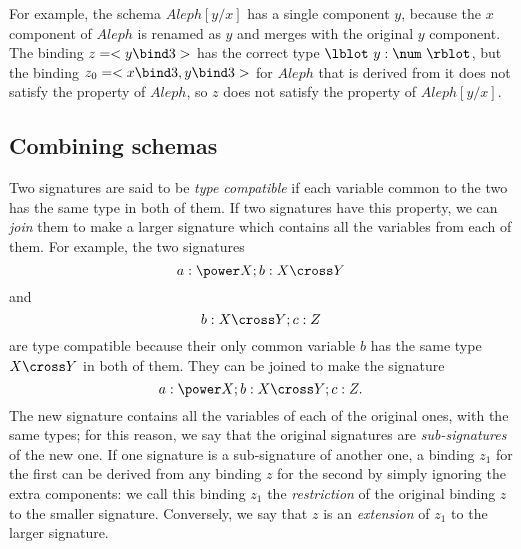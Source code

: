 \new For example, the schema $Aleph[y/x]$ has a single component
$y$, because the $x$ component of $Aleph$ is renamed as $y$ and
merges with the original $y$ component.  The binding $z = <y \bind 3>$
has the correct type $\lblot~y: \num~\rblot$, but the binding $z_0 =
<x \bind 3, y \bind 3>$ for $Aleph$ that is derived from it does not
satisfy the property of $Aleph$, so $z$ does not satisfy the
property of $Aleph[y/x]$.

\subsection{Combining schemas}\label{ss:combschema}

Two signatures are said to be 
{\em type compatible\/}%
if each variable common to the two has the same type in
both of them. If two signatures have this property, we can
{\em join\/}%
them to make a larger signature which contains all the variables
from each of them. For example, the two signatures
\[ a: \power X; b: X \cross Y \]
and
\[ b: X \cross Y; c: Z \] 
are type compatible because their only common variable $b$ has
the same type $X \cross Y$ in both of them. They can be joined to
make the signature
\[ a: \power X; b: X \cross Y; c: Z. \]
The new signature contains all the variables of each of the original
ones, with the same types; for this reason, we say that the original
signatures are {\em sub-signatures\/}%
of the new one. If one signature is a sub-signature of another one,
a binding $z_1$ for the first can be derived from any %
binding $z$ for
the second by simply ignoring the extra components: we call this
binding $z_1$ the {\em restriction\/}%
of the original binding $z$ to the smaller signature. Conversely, we say
that $z$ is an {\em extension\/}%
of $z_1$ to the larger signature.

